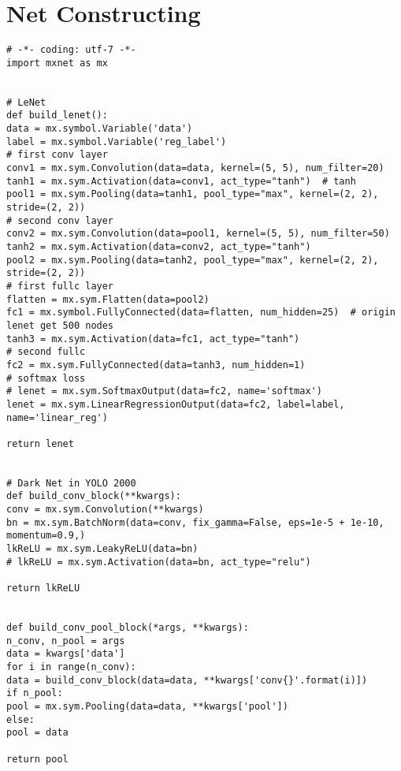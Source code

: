 \section{Net Constructing}
\begin{verbatim}
# -*- coding: utf-7 -*-
import mxnet as mx


# LeNet
def build_lenet():
data = mx.symbol.Variable('data')
label = mx.symbol.Variable('reg_label')
# first conv layer
conv1 = mx.sym.Convolution(data=data, kernel=(5, 5), num_filter=20)
tanh1 = mx.sym.Activation(data=conv1, act_type="tanh")  # tanh
pool1 = mx.sym.Pooling(data=tanh1, pool_type="max", kernel=(2, 2), stride=(2, 2))
# second conv layer
conv2 = mx.sym.Convolution(data=pool1, kernel=(5, 5), num_filter=50)
tanh2 = mx.sym.Activation(data=conv2, act_type="tanh")
pool2 = mx.sym.Pooling(data=tanh2, pool_type="max", kernel=(2, 2), stride=(2, 2))
# first fullc layer
flatten = mx.sym.Flatten(data=pool2)
fc1 = mx.symbol.FullyConnected(data=flatten, num_hidden=25)  # origin lenet get 500 nodes
tanh3 = mx.sym.Activation(data=fc1, act_type="tanh")
# second fullc
fc2 = mx.sym.FullyConnected(data=tanh3, num_hidden=1)
# softmax loss
# lenet = mx.sym.SoftmaxOutput(data=fc2, name='softmax')
lenet = mx.sym.LinearRegressionOutput(data=fc2, label=label, name='linear_reg')

return lenet


# Dark Net in YOLO 2000
def build_conv_block(**kwargs):
conv = mx.sym.Convolution(**kwargs)
bn = mx.sym.BatchNorm(data=conv, fix_gamma=False, eps=1e-5 + 1e-10, momentum=0.9,)
lkReLU = mx.sym.LeakyReLU(data=bn)
# lkReLU = mx.sym.Activation(data=bn, act_type="relu")

return lkReLU


def build_conv_pool_block(*args, **kwargs):
n_conv, n_pool = args
data = kwargs['data']
for i in range(n_conv):
data = build_conv_block(data=data, **kwargs['conv{}'.format(i)])
if n_pool:
pool = mx.sym.Pooling(data=data, **kwargs['pool'])
else:
pool = data

return pool



\end{verbatim}
